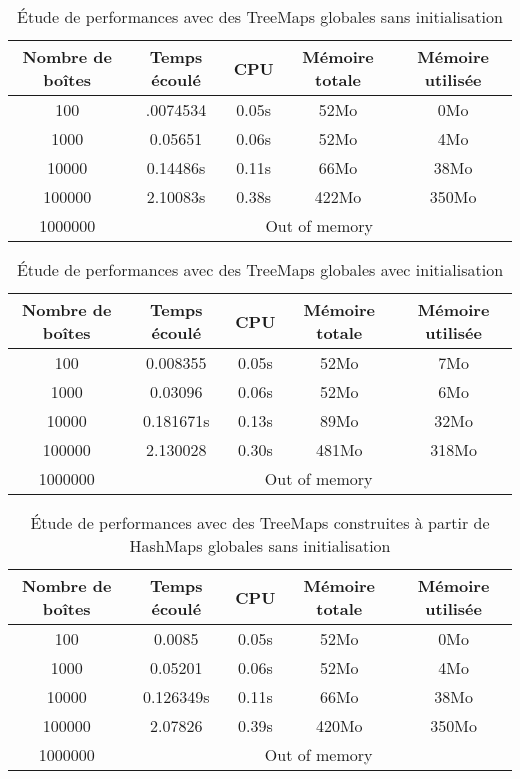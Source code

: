\begin{table}[h]
  \centering
\begin{tabular}{|c|c|c|c|c|}
\hline
Nombre de boîtes & Temps écoulé & CPU & Mémoire totale & Mémoire utilisée\\
\hline
100 & .0074534& 0.05s & 52Mo & 0Mo\\
\hline
1000 & 0.05651 & 0.06s & 52Mo & 4Mo\\
\hline
10000 & 0.14486s & 0.11s & 66Mo & 38Mo\\
\hline
100000 & 2.10083s & 0.38s & 422Mo & 350Mo\\
\hline
1000000 & \multicolumn{4}{|c|}{Out of memory}\\
\hline
\end{tabular}
\caption{Étude de performances avec des TreeMaps globales sans initialisation} 
\label{tab:treemapglobal}
\end{table}

\begin{table}[h]
  \centering
\begin{tabular}{|c|c|c|c|c|}
\hline
Nombre de boîtes & Temps écoulé & CPU & Mémoire totale & Mémoire utilisée\\
\hline
100 & 0.008355 & 0.05s & 52Mo & 7Mo\\
\hline
1000 & 0.03096 & 0.06s & 52Mo & 6Mo\\
\hline
10000 & 0.181671s & 0.13s & 89Mo & 32Mo\\
\hline
100000 & 2.130028 & 0.30s & 481Mo & 318Mo\\
\hline
1000000 & \multicolumn{4}{|c|}{Out of memory}\\
\hline
\end{tabular}
\caption{Étude de performances avec des TreeMaps globales avec initialisation}
\label{tab:treemapglobalInit}
\end{table}



\begin{table}[h]
  \centering
\begin{tabular}{|c|c|c|c|c|}
\hline
Nombre de boîtes & Temps écoulé & CPU & Mémoire totale & Mémoire utilisée\\
\hline
100 & 0.0085 & 0.05s & 52Mo & 0Mo\\
\hline
1000 & 0.05201 & 0.06s & 52Mo & 4Mo\\
\hline
10000 & 0.126349s & 0.11s & 66Mo & 38Mo\\
\hline
100000 & 2.07826 & 0.39s & 420Mo & 350Mo\\
\hline
1000000 & \multicolumn{4}{|c|}{Out of memory}\\
\hline
\end{tabular}
\caption{Étude de performances avec des TreeMaps construites à partir de HashMaps globales sans initialisation} 
\label{tab:treehashmapglobal}
\end{table}

